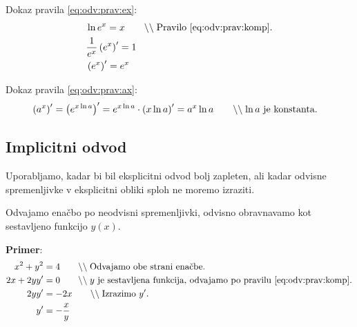 \documentclass[a4paper,oneside,12pt,fleqn]{article}
\newcommand\krat\cdot
\newcommand{\comment}[1]{\ensuremath{\qquad\backslash\backslash\;}\textnormal{#1}}
\numberwithin{equation}{section}
\begin{document}
Dokaz pravila \eqref{eq:odv:prav:ex}:
\begin{align*}
  & \ln e^x = x \comment{Pravilo \eqref{eq:odv:prav:komp}.} \\
  & \frac{1}{e^x}\left( e^x \right)' = 1 \\
  & \left( e^x \right)' = e^x
\end{align*}

Dokaz pravila \eqref{eq:odv:prav:ax}:
\begin{align*}
  & \left(a^x\right)' = \left( e^{x\ln a} \right)' = e^{x\ln a}\krat \left(x\ln a\right)'
  = a^x\ln a \comment{$\ln a$ je konstanta.}
\end{align*}

\subsection{Implicitni odvod}
\label{sec:odv:impl}
Uporabljamo, kadar bi bil eksplicitni odvod bolj zapleten, ali kadar odvisne spremenljivke
v eksplicitni obliki sploh ne moremo izraziti.

Odvajamo enačbo po neodvisni spremenljivki, odvisno obravnavamo kot sestavljeno funkcijo
$y(x)$.

\textbf{Primer}:
\begin{align*}
  x^2 + y^2 &= 4  \comment{Odvajamo obe strani enačbe.} \\
  2x + 2yy' &= 0  \comment{$y$ je sestavljena funkcija, odvajamo po pravilu
  \eqref{eq:odv:prav:komp}.} \\
  2yy' &= -2x \comment{Izrazimo $y'$.} \\
  y' &= -\frac{x}{y} 
\end{align*}


\pagebreak
\listoffigures
\end{document}
